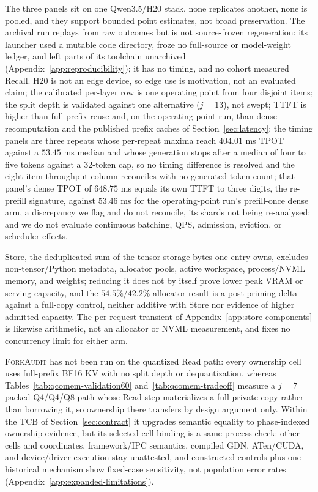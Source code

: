 \documentclass{article}
\newcommand{\method}{\textsc{ForkAudit}}
\begin{document}
The three panels sit on one Qwen3.5/H20 stack, none replicates another, none is
pooled, and they support bounded point estimates, not broad preservation.  The
archival run replays from raw outcomes but is not
source-frozen regeneration: its launcher used a mutable code directory, froze no
full-source or model-weight ledger, and left parts of its toolchain unarchived
(Appendix~\ref{app:reproducibility}); it has no timing, and no cohort measured
Recall.  H20 is not an edge device, so edge use is motivation, not an evaluated
claim; the calibrated per-layer row is one operating point from four disjoint
items; the split depth is validated against one alternative ($j=13$), not swept;
TTFT is higher than full-prefix reuse and, on the operating-point run, than
dense recomputation and the published prefix caches of
Section~\ref{sec:latency}; the timing panels are three repeats whose per-repeat
maxima reach $404.01$ ms TPOT against a $53.45$ ms median and whose generation
stops after a median of four to five tokens against a 32-token cap, so no timing
difference is resolved and the eight-item throughput column reconciles with no
generated-token count; that panel's dense TPOT of $648.75$ ms equals its own TTFT
to three digits, the re-prefill signature, against $53.46$ ms for the
operating-point run's prefill-once dense arm, a discrepancy we flag and do not
reconcile, its shards not being re-analysed; and we do not evaluate continuous
batching, QPS, admission, eviction, or scheduler effects.

Store, the deduplicated sum of the tensor-storage bytes one entry owns, excludes
non-tensor/Python metadata, allocator pools, active workspace, process/NVML
memory, and weights; reducing it does not by itself prove lower peak VRAM or
serving capacity, and the $54.5\%$/$42.2\%$ allocator result is a post-priming
delta against a full-copy control, neither additive with Store nor evidence of
higher admitted capacity.  The per-request transient of
Appendix~\ref{app:store-components} is likewise arithmetic, not an allocator or
NVML measurement, and fixes no concurrency limit for either arm.

\method{} has not been run on the quantized Read path: every ownership cell uses
full-prefix BF16 KV with no split depth or dequantization, whereas
Tables~\ref{tab:qcomem-validation60} and~\ref{tab:qcomem-tradeoff} measure a
$j=7$ packed Q4/Q4/Q8 path whose Read step materializes a full private copy
rather than borrowing it, so ownership there transfers by design argument only.
Within the TCB of Section~\ref{sec:contract} it upgrades semantic equality to
phase-indexed ownership evidence, but its selected-cell binding is a
same-process check: other cells and coordinates, framework/IPC semantics,
compiled GDN, ATen/CUDA, and device/driver execution stay unattested, and
constructed controls plus one historical mechanism show fixed-case sensitivity,
not population error rates (Appendix~\ref{app:expanded-limitations}).
\end{document}
